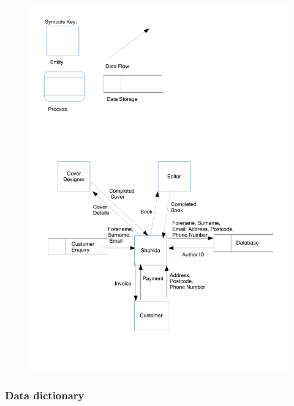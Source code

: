 \begin{figure}[H]
    \includegraphics[width=\textwidth]{./Analysis/Data Flow Diagrams 2.pdf}
\end{figure}

\subsubsection{Data dictionary}

